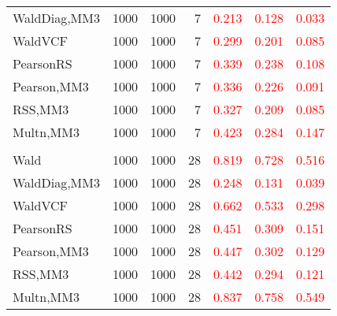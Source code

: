 \documentclass[
]{article}
\begin{document}
\begin{table}[H]
{\begin{tabular}[t]{lrrrrrr}
\hspace{1em}WaldDiag,MM3 & 1000 & 1000 & 7 & \textcolor{red}{0.213} & \textcolor{red}{0.128} & \textcolor{red}{0.033}\\
\hspace{1em}WaldVCF & 1000 & 1000 & 7 & \textcolor{red}{0.299} & \textcolor{red}{0.201} & \textcolor{red}{0.085}\\
\hspace{1em}PearsonRS & 1000 & 1000 & 7 & \textcolor{red}{0.339} & \textcolor{red}{0.238} & \textcolor{red}{0.108}\\
\hspace{1em}Pearson,MM3 & 1000 & 1000 & 7 & \textcolor{red}{0.336} & \textcolor{red}{0.226} & \textcolor{red}{0.091}\\
\hspace{1em}RSS,MM3 & 1000 & 1000 & 7 & \textcolor{red}{0.327} & \textcolor{red}{0.209} & \textcolor{red}{0.085}\\
\hspace{1em}Multn,MM3 & 1000 & 1000 & 7 & \textcolor{red}{0.423} & \textcolor{red}{0.284} & \textcolor{red}{0.147}\\
\addlinespace[0.3em]
\multicolumn{7}{l}{\textbf{3F 15V}}\\
\hspace{1em}Wald & 1000 & 1000 & 28 & \textcolor{red}{0.819} & \textcolor{red}{0.728} & \textcolor{red}{0.516}\\
\hspace{1em}WaldDiag,MM3 & 1000 & 1000 & 28 & \textcolor{red}{0.248} & \textcolor{red}{0.131} & \textcolor{red}{0.039}\\
\hspace{1em}WaldVCF & 1000 & 1000 & 28 & \textcolor{red}{0.662} & \textcolor{red}{0.533} & \textcolor{red}{0.298}\\
\hspace{1em}PearsonRS & 1000 & 1000 & 28 & \textcolor{red}{0.451} & \textcolor{red}{0.309} & \textcolor{red}{0.151}\\
\hspace{1em}Pearson,MM3 & 1000 & 1000 & 28 & \textcolor{red}{0.447} & \textcolor{red}{0.302} & \textcolor{red}{0.129}\\
\hspace{1em}RSS,MM3 & 1000 & 1000 & 28 & \textcolor{red}{0.442} & \textcolor{red}{0.294} & \textcolor{red}{0.121}\\
\hspace{1em}Multn,MM3 & 1000 & 1000 & 28 & \textcolor{red}{0.837} & \textcolor{red}{0.758} & \textcolor{red}{0.549}\\
\bottomrule
\end{tabular}}
\endgroup{}
\end{table}
\end{document}
